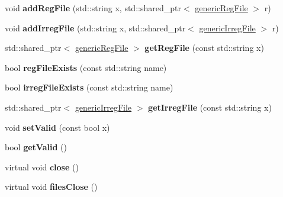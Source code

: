 \begin{DoxyCompactItemize}
void {\bfseries add\+Reg\+File} (std\+::string x, std\+::shared\+\_\+ptr$<$ \hyperlink{class_s_e_p_1_1generic_reg_file}{generic\+Reg\+File} $>$ r)
\item 
\mbox{\label{class_s_e_p_1_1generic_i_o_af047c6b63743366e770c249ae56d465f}} 
void {\bfseries add\+Irreg\+File} (std\+::string x, std\+::shared\+\_\+ptr$<$ \hyperlink{class_s_e_p_1_1generic_irreg_file}{generic\+Irreg\+File} $>$ r)
\item 
\mbox{\label{class_s_e_p_1_1generic_i_o_ae72b99925036dde53b2e38962d0d16fb}} 
std\+::shared\+\_\+ptr$<$ \hyperlink{class_s_e_p_1_1generic_reg_file}{generic\+Reg\+File} $>$ {\bfseries get\+Reg\+File} (const std\+::string x)
\item 
\mbox{\label{class_s_e_p_1_1generic_i_o_ab0b7cd1b05272a59081f7cfcb0bcaee7}} 
bool {\bfseries reg\+File\+Exists} (const std\+::string name)
\item 
\mbox{\label{class_s_e_p_1_1generic_i_o_acb8dfcaf3cc5c599812e371053641ad7}} 
bool {\bfseries irreg\+File\+Exists} (const std\+::string name)
\item 
\mbox{\label{class_s_e_p_1_1generic_i_o_a02a4be53819f451ae4837035e44851b4}} 
std\+::shared\+\_\+ptr$<$ \hyperlink{class_s_e_p_1_1generic_irreg_file}{generic\+Irreg\+File} $>$ {\bfseries get\+Irreg\+File} (const std\+::string x)
\item 
\mbox{\label{class_s_e_p_1_1generic_i_o_a7e1910eb9810760ca1f7146f10ecc1f1}} 
void {\bfseries set\+Valid} (const bool x)
\item 
\mbox{\label{class_s_e_p_1_1generic_i_o_a4307aa70ee916b62852be02bbbdfe9fd}} 
bool {\bfseries get\+Valid} ()
\item 
\mbox{\label{class_s_e_p_1_1generic_i_o_a579e25c13ae33d567ab823e89be2ec66}} 
virtual void {\bfseries close} ()
\item 
\mbox{\label{class_s_e_p_1_1generic_i_o_af217b7f3dad69fa80799e06d1f2555f7}} 
virtual void {\bfseries files\+Close} ()
\end{DoxyCompactItemize}
